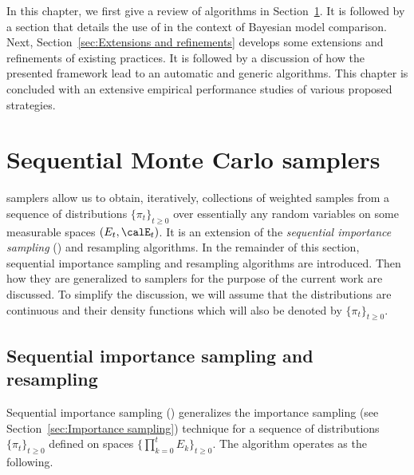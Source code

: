 In this chapter, we first give a review of \smc algorithms in
Section~\ref{sec:Sequential Monte Carlo samplers}. It is followed by a section
that details the use of \smc in the context of Bayesian model comparison.
Next, Section~\ref{sec:Extensions and refinements} develops some extensions
and refinements of existing practices. It is followed by a discussion of how
the presented framework lead to an automatic and generic algorithms. This
chapter is concluded with an extensive empirical performance studies of
various proposed strategies.

\section{Sequential Monte Carlo samplers}
\label{sec:Sequential Monte Carlo samplers}

\smc samplers allow us to obtain, iteratively, collections of weighted samples
from a sequence of distributions $\{\pi_t\}_{t\ge0}$ over essentially any
random variables on some measurable spaces $(E_t,\calE_t)$. It is an extension
of the \emph{sequential importance sampling} (\sis) and resampling algorithms.
In the remainder of this section, sequential importance sampling and
resampling algorithms are introduced. Then how they are generalized to \smc
samplers for the purpose of the current work are discussed. To simplify the
discussion, we will assume that the distributions are continuous and their
density functions which will also be denoted by $\{\pi_t\}_{t\ge0}$.

\subsection{Sequential importance sampling and resampling}
\label{sub:Sequential importance sampling and resampling}

Sequential importance sampling (\sis) generalizes the importance sampling (see
Section~\ref{sec:Importance sampling}) technique for a sequence of
distributions $\{\pi_t\}_{t\ge0}$ defined on spaces
$\{\prod_{k=0}^tE_k\}_{t\ge0}$. The algorithm operates as the following.

